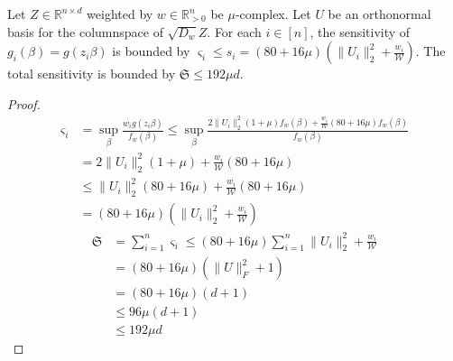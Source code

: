 \begin{lemma}
    Let $Z \in \mathbb{R}^{n \times d}$ weighted by $w \in \mathbb{R}^n_{>0}$
    be $\mu$-complex. Let $U$ be an orthonormal basis for the columnspace
    of $\sqrt{D_w} Z$. 
    For each $i \in [n]$, the sensitivity of $g_i(\beta) = g(z_i \beta)$
    is bounded by 
    $\varsigma_i \leq s_i = (80 + 16\mu)(\lVert U_i \rVert_2^2 + \frac{w_i}{\mathcal{W}})$.
    The total sensitivity is bounded by $\mathfrak{S} \leq 192 \mu d$.
\end{lemma}
\begin{proof}
    \begin{align*}
        \varsigma_i 
         & = \sup_{\beta} \frac{w_i g(z_i \beta)}{f_w(\beta)}
        \leq \sup_{\beta} \frac{2 \lVert U_i \rVert_2^2 (1 + \mu) f_w(\beta)
            + \frac{w_i}{\mathcal{W}} (80 + 16 \mu) f_w(\beta)}{f_w(\beta)}                  \\
         & = 2 \lVert U_i \rVert_2^2 (1 + \mu) + \frac{w_i}{\mathcal{W}} (80 + 16 \mu)       \\
         & \leq \lVert U_i \rVert_2^2 (80 + 16 \mu) +  \frac{w_i}{\mathcal{W}} (80 + 16 \mu) \\
         & = (80 + 16\mu)(\lVert U_i \rVert_2^2 + \frac{w_i}{\mathcal{W}})
    \end{align*}
    \begin{align*}
        \mathfrak{S}
         & = \sum_{i=1}^n \varsigma_i \leq (80 + 16\mu) \sum_{i=1}^n \lVert U_i \rVert_2^2 + \frac{w_i}{\mathcal{W}} \\
         & = (80 + 16 \mu)(\lVert U \rVert_F^2 + 1)                                                                  \\
         & = (80 + 16 \mu)(d + 1)                                                                                    \\
         & \leq 96 \mu(d + 1)                                                                                        \\
         & \leq 192 \mu d
    \end{align*}
\end{proof}